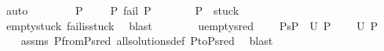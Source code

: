 \begin{isabellebody}
\ auto\isanewline
\ \ \isamarkupfalse%
\ \isakeywordONE{{\isacharbraceright}{\kern0pt}}\isamarkupfalse%
\isanewline
\isanewline
\ \ \isakeywordONE{{\isacharbraceleft}{\kern0pt}}\isamarkupfalse%
\isamarkupfalse%
\ {\isachardoublequoteopen}P\ {\isasymin}\ {\isacharbraceleft}{\kern0pt}{\isacharparenleft}{\kern0pt}{\isacharbrackleft}{\kern0pt}{\isacharbrackright}{\kern0pt}{\isacharcomma}{\kern0pt}\ {\isacharbrackleft}{\kern0pt}{\isacharbrackright}{\kern0pt}{\isacharparenright}{\kern0pt}{\isacharbraceright}{\kern0pt}\ {\isasymunion}\ {\isacharbraceleft}{\kern0pt}P{}{\isachardot}{\kern0pt}\ fail\ P{}{\isacharbraceright}{\kern0pt}{\isachardoublequoteclose}\isanewline
\ \ \ \ \isamarkupfalse%
\ \isamarkupfalse%
\ {\isachardoublequoteopen}P\ {\isasymin}\ stuck{\isachardoublequoteclose}\ \isanewline
\ \ \ \ \ \ \isamarkupfalse%
\ empty{\isacharunderscore}{\kern0pt}stuck\ fail{\isacharunderscore}{\kern0pt}is{\isacharunderscore}{\kern0pt}stuck\ \isamarkupfalse%
\ blast\isanewline
\ \ \ \ \ \ \isakeywordONE{{\isacharbraceright}{\kern0pt}}\isamarkupfalse%
\isanewline
{}\isamarkupfalse%
%
\endisatagproof
{\isafoldproof}%
%
\isadelimproof
\isanewline
%
\endisadelimproof
\isanewline
\isanewline
\isanewline
\isanewline
{}\isamarkupfalse%
\ u{\isacharunderscore}{\kern0pt}empty{\isacharunderscore}{\kern0pt}sred{\isacharcolon}{\kern0pt}\ \isanewline
\ \ \ {\isachardoublequoteopen}P{}{\isasymturnstile}s{\isasymleadsto}P{}{\isachardoublequoteclose}\ \ {\isachardoublequoteopen}U\ P{}\ {\isacharequal}{\kern0pt}{\isacharbraceleft}{\kern0pt}{\isacharbraceright}{\kern0pt}{\isachardoublequoteclose}\isanewline
\ \ \ {\isachardoublequoteopen}U\ P{}\ {\isacharequal}{\kern0pt}\ {\isacharbraceleft}{\kern0pt}{\isacharbraceright}{\kern0pt}{\isachardoublequoteclose}\isanewline
%
\isadelimproof
\ \ %
\endisadelimproof
%
\isatagproof
{}\isamarkupfalse%
\ assms\ P{}{\isacharunderscore}{\kern0pt}from{\isacharunderscore}{\kern0pt}P{}{\isacharunderscore}{\kern0pt}sred\ all{\isacharunderscore}{\kern0pt}solutions{\isacharunderscore}{\kern0pt}def\ P{}{\isacharunderscore}{\kern0pt}to{\isacharunderscore}{\kern0pt}P{}{\isacharunderscore}{\kern0pt}sred\ \isamarkupfalse%
\ blast%
\endisatagproof
{\isafoldproof}%
%
\isadelimproof
\isanewline

\end{isabellebody}
